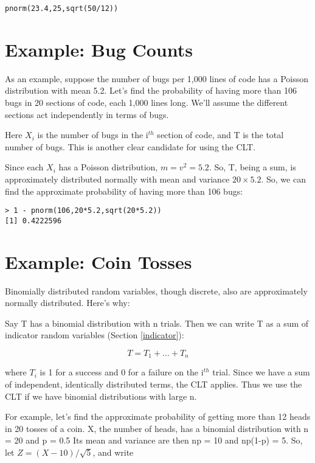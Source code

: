 \begin{lstlisting}
pnorm(23.4,25,sqrt(50/12))
\end{lstlisting}

\section{Example:  Bug Counts}

As an example, suppose the number of bugs per 1,000 lines of code has a
Poisson distribution with mean 5.2.  Let's find the probability of
having more than 106 bugs in 20 sections of code, each 1,000 lines long.
We'll assume the different sections act independently in terms of bugs.

Here $X_i$ is the number of bugs in the i$^{th}$ section of code, and T
is the total number of bugs.  This is another clear candidate for using
the CLT.

Since each $X_i$ has a Poisson distribution, $m = v^2 = 5.2$.  So, T,
being a sum, is approximately distributed normally with mean and
variance $20 \times 5.2$.  So, we can find the approximate probability
of having more than 106 bugs:

\begin{Verbatim}[fontsize=\relsize{-2}]
> 1 - pnorm(106,20*5.2,sqrt(20*5.2))
[1] 0.4222596
\end{Verbatim}

\section{Example:  Coin Tosses}
\label{correctcontin}

Binomially distributed random variables, though discrete, also are
approximately normally distributed.  Here's why:

Say T has a binomial distribution with n trials.  Then we  
can write T as a sum of indicator random variables (Section
\ref{indicator}):

\begin{equation}
T = T_1+...+T_n
\end{equation}

where $T_i$ is 1 for a success and 0 for a failure on the i$^{th}$
trial.  Since we have a sum of independent, identically distributed
terms, the CLT applies.  Thus we use the CLT if we have binomial
distributions with large n.

For example, let's find the approximate probability of getting more than
12 heads in 20 tosses of a coin.  X, the number of heads, has a binomial
distribution with n = 20 and p = 0.5  Its mean and variance are then
np = 10 and np(1-p) = 5.  So, let $Z = (X-10)/\sqrt{5}$, and write

